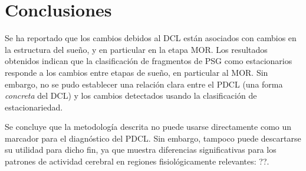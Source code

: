 \documentclass[12pt,letterpaper,draft]{book}
\begin{document}
%


\section{Conclusiones}

Se ha reportado que los cambios debidos al DCL están asociados con cambios en la estructura del sueño, y en particular en la etapa MOR.
%
Los resultados obtenidos indican que la clasificación de fragmentos de PSG como estacionarios responde a los cambios entre etapas de sueño, en particular al MOR.
%
Sin embargo, no se pudo establecer una relación clara entre el PDCL (una forma \textit{concreta} del DCL) y los cambios detectados usando la clasificación de estacionariedad.

Se concluye que la metodología descrita no puede usarse directamente como un marcador para el diagnóstico del PDCL.
%
Sin embargo, tampoco puede descartarse su utilidad para dicho fin, ya que muestra diferencias significativas para los patrones de actividad cerebral en regiones fisiológicamente relevantes: ??.
\end{document}
